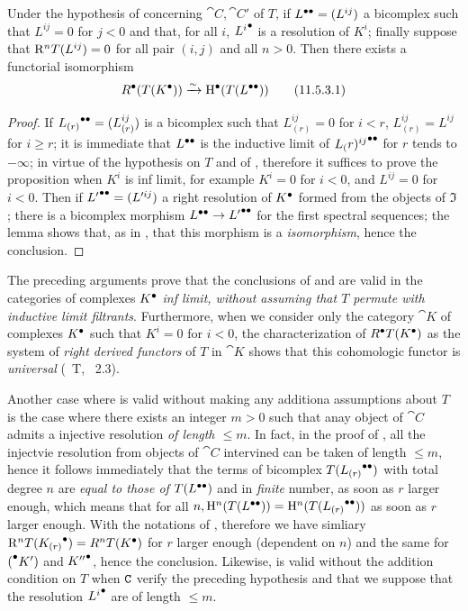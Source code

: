 \begin{proposition}[11.5.3]
\label{0.11.5.3}
Under the hypothesis of  concerning $\cat{C}, \cat{C'}$ of $T$, if ${L}^{\bullet\bullet} = (L^{ij})$ a bicomplex such that $L^{ij} = 0$ for $j<0$ and that, for all $i$, 
${L^i}^{\bullet}$ is a resolution of $K^i$; finally suppose that $\mathrm{R}^n T(L^{ij}) = 0$ for all pair $(i,j)$ and all $n>0$. Then there exists a functorial isomorphism 
\[
  \label{0.11.5.3.1}
  {R}^{\bullet}(T({K}^{\bullet}))\xrightarrow{\sim} {\mathrm{H}}^{\bullet}(T({L}^{\bullet\bullet}))
  \tag{11.5.3.1}
\]
\end{proposition}
\begin{proof}
If ${L_{(r)}}^{\bullet\bullet} = (L_{(r)}^{ij})$ is a bicomplex such that $L_{(r)}^{ij} = 0$ for $i<r$, $L_{(r)}^{ij} = L^{ij}$ for $i\geq r$;
it is immediate that ${L}^{\bullet\bullet}$ is the inductive limit of ${L_(r)^{ij}}^{\bullet\bullet}$ for $r$ tends to $-\infty$; 
in virtue of the hypothesis on $T$ and of , therefore it suffices to prove the proposition when $K^i$ is inf limit, for example $K^i=0$ for $i<0$, 
and $L^{ij} = 0$ for $i<0$. Then if ${L'}^{\bullet\bullet} = (L'^{ij})$ a right resolution of ${K}^{\bullet}$ formed from the objects of $\mathfrak{I}$ ;
there is a bicomplex morphism ${L}^{\bullet\bullet}\rightarrow {L'}^{\bullet\bullet}$ for the first spectral sequences; the lemma  shows that, as in , 
that this morphism is a \emph{isomorphism}, hence the conclusion.
\end{proof}

\begin{remark}[11.5.4]
\label{0.11.5.4}
The preceding arguments prove that the conclusions of  and  are valid in the categories of complexes ${K}^{\bullet}$ 
\emph{inf limit, without assuming that $T$ permute with inductive limit filtrants}. Furthermore, when we consider only the category $\cat{K}$ of complexes ${K}^{\bullet}$ such that $K^i=0$ for $i<0$, 
the characterization of ${R}^{\bullet} T({K}^{\bullet})$ as the system of \emph{right derived functors} of $T$ in $\cat{K}$ shows that this cohomologic functor is \emph{universal} (~T, ~2.3).

Another case where  is valid without making any additiona assumptions about $T$ is the case where there exists an integer $m>0$ such that anay object of $\cat{C}$ admits a injective resolution \emph{of length $\leq m$}.
In fact, in the proof of , all the injectvie resolution from objects of $\cat{C}$ intervined can be taken of length $\leq m$, hence it follows immediately that the terms of bicomplex $T({L_{(r)}}^{\bullet\bullet})$ with total degree $n$ 
are \emph{equal to those of} $T({L}^{\bullet\bullet})$ and in \emph{finite} number, as soon as $r$ larger enough, which means that for all $n, \mathrm{H}^n(T({L}^{\bullet\bullet})) = \mathrm{H}^n(T({L_{(r)}}^{\bullet\bullet}))$ as soon as $r$ larger enough.
With the notations of , therefore we have simliary $\mathrm{R}^nT({K_{(r)}}^{\bullet}) = R^n T({K}^{\bullet})$ for $r$ larger enough (dependent on $n$) and the same for ${(}^{\bullet}K')$ and ${K''}^{\bullet}$, hence the conclusion.
Likewise,  is valid without the addition condition on $T$ when $\mathtt{C}$ verify the preceding hypothesis and that we suppose that the resolution ${L^i}^{\bullet}$ are of length $\leq m$.
\end{remark}

